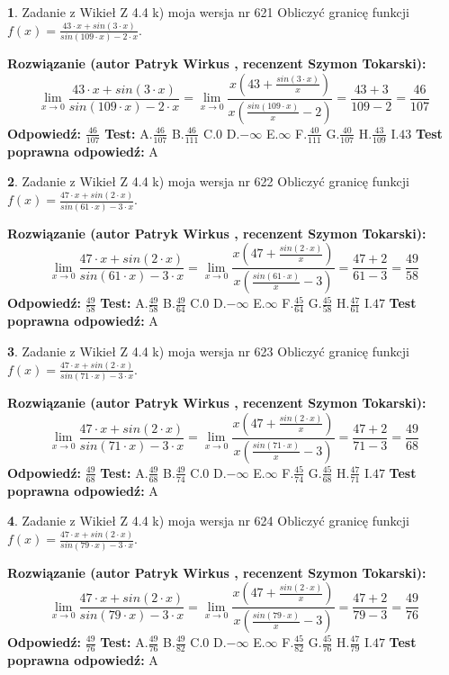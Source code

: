 \documentclass[12pt, a4paper]{article}
\theoremstyle{definition} %
\newtheorem{zad}{}
\newcommand{\zadStart}[1]{\begin{zad}#1\newline}
\newcommand{\zadStop}{\end{zad}}
\newcommand{\rozwStart}[2]{\noindent \textbf{Rozwiązanie (autor #1 , recenzent #2): }\newline}
\newcommand{\rozwStop}{\newline}
\newcommand{\odpStart}{\noindent \textbf{Odpowiedź:}\newline}
\newcommand{\odpStop}{\newline}
\newcommand{\testStart}{\noindent \textbf{Test:}\newline}
\newcommand{\testStop}{\newline}
\newcommand{\kluczStart}{\noindent \textbf{Test poprawna odpowiedź:}\newline}
\newcommand{\kluczStop}{\newline}
\begin{document}
\zadStart{Zadanie z Wikieł Z 4.4 k) moja wersja nr 621}
Obliczyć granicę funkcji $f(x)=\frac{43\cdot x +sin(3\cdot x)}{sin(109\cdot x) -2\cdot x}$.
\zadStop
\rozwStart{Patryk Wirkus}{Szymon Tokarski}
$$\lim\limits_{x\to 0}\frac{43\cdot x +sin(3\cdot x)}{sin(109\cdot x) -2\cdot x}
=\lim\limits_{x\to 0}\frac{x(43+\frac{sin(3\cdot x)}{x})}{x(\frac{sin(109\cdot x)}{x}-2)}
=\frac{43+3}{109-2} = \frac{46}{107}$$
\rozwStop
\odpStart
$\frac{46}{107}$
\odpStop
\testStart
A.$\frac{46}{107}$
B.$\frac{46}{111}$
C.$0$
D.$-\infty$
E.$\infty$
F.$\frac{40}{111}$
G.$\frac{40}{107}$
H.$\frac{43}{109}$
I.$43$
\testStop
\kluczStart
A
\kluczStop



\zadStart{Zadanie z Wikieł Z 4.4 k) moja wersja nr 622}
Obliczyć granicę funkcji $f(x)=\frac{47\cdot x +sin(2\cdot x)}{sin(61\cdot x) -3\cdot x}$.
\zadStop
\rozwStart{Patryk Wirkus}{Szymon Tokarski}
$$\lim\limits_{x\to 0}\frac{47\cdot x +sin(2\cdot x)}{sin(61\cdot x) -3\cdot x}
=\lim\limits_{x\to 0}\frac{x(47+\frac{sin(2\cdot x)}{x})}{x(\frac{sin(61\cdot x)}{x}-3)}
=\frac{47+2}{61-3} = \frac{49}{58}$$
\rozwStop
\odpStart
$\frac{49}{58}$
\odpStop
\testStart
A.$\frac{49}{58}$
B.$\frac{49}{64}$
C.$0$
D.$-\infty$
E.$\infty$
F.$\frac{45}{64}$
G.$\frac{45}{58}$
H.$\frac{47}{61}$
I.$47$
\testStop
\kluczStart
A
\kluczStop



\zadStart{Zadanie z Wikieł Z 4.4 k) moja wersja nr 623}
Obliczyć granicę funkcji $f(x)=\frac{47\cdot x +sin(2\cdot x)}{sin(71\cdot x) -3\cdot x}$.
\zadStop
\rozwStart{Patryk Wirkus}{Szymon Tokarski}
$$\lim\limits_{x\to 0}\frac{47\cdot x +sin(2\cdot x)}{sin(71\cdot x) -3\cdot x}
=\lim\limits_{x\to 0}\frac{x(47+\frac{sin(2\cdot x)}{x})}{x(\frac{sin(71\cdot x)}{x}-3)}
=\frac{47+2}{71-3} = \frac{49}{68}$$
\rozwStop
\odpStart
$\frac{49}{68}$
\odpStop
\testStart
A.$\frac{49}{68}$
B.$\frac{49}{74}$
C.$0$
D.$-\infty$
E.$\infty$
F.$\frac{45}{74}$
G.$\frac{45}{68}$
H.$\frac{47}{71}$
I.$47$
\testStop
\kluczStart
A
\kluczStop



\zadStart{Zadanie z Wikieł Z 4.4 k) moja wersja nr 624}
Obliczyć granicę funkcji $f(x)=\frac{47\cdot x +sin(2\cdot x)}{sin(79\cdot x) -3\cdot x}$.
\zadStop
\rozwStart{Patryk Wirkus}{Szymon Tokarski}
$$\lim\limits_{x\to 0}\frac{47\cdot x +sin(2\cdot x)}{sin(79\cdot x) -3\cdot x}
=\lim\limits_{x\to 0}\frac{x(47+\frac{sin(2\cdot x)}{x})}{x(\frac{sin(79\cdot x)}{x}-3)}
=\frac{47+2}{79-3} = \frac{49}{76}$$
\rozwStop
\odpStart
$\frac{49}{76}$
\odpStop
\testStart
A.$\frac{49}{76}$
B.$\frac{49}{82}$
C.$0$
D.$-\infty$
E.$\infty$
F.$\frac{45}{82}$
G.$\frac{45}{76}$
H.$\frac{47}{79}$
I.$47$
\testStop
\kluczStart
A
\kluczStop
\end{document}
